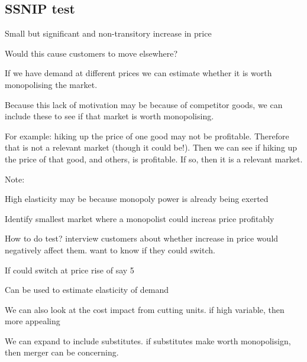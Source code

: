 
\subsection{SSNIP test}

Small but significant and non-transitory increase in price

Would this cause customers to move elsewhere?

If we have demand at different prices we can estimate whether it is worth monopolising the market.

Because this lack of motivation may be because of competitor goods, we can include these to see if that market is worth monopolising.

For example: hiking up the price of one good may not be profitable. Therefore that is not a relevant market (though it could be!). Then we can see if hiking up the price of that good, and others, is profitable. If so, then it is a relevant market.

Note:

High elasticity may be because monopoly power is already being exerted

Identify smallest market where a monopolist could increas price profitably

How to do test? interview customers about whether increase in price would negatively affect them. want to know if they could switch.

If could switch at price rise of say 5%

Can be used to estimate elasticity of demand

We can also look at the cost impact from cutting units. if high variable, then more appealing

We can expand to include substitutes. if substitutes make worth monopolisign, then merger can be concerning.

